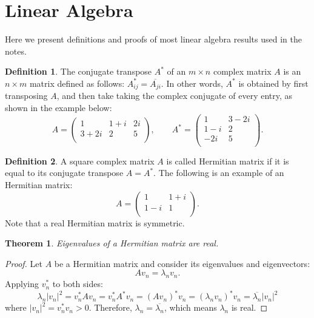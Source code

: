 \documentclass{article}
\newtheorem{theorem}{Theorem}[section]
\theoremstyle{definition}
\newtheorem{definition}{Definition}[section]
\begin{document}
\clearpage
\appendix
\section{Linear Algebra}
Here we present definitions and proofs of most linear algebra results used in the notes.
\begin{definition}
The conjugate transpose $A^*$ of an $m\times n$ complex matrix $A$ is an $n \times m$ matrix defined as follows: $A^*_{ij}=\overline{A_{ji}}$. In other words, $A^*$ is obtained by first transposing $A$, and then take taking the complex conjugate of every entry, as shown in the example below:
\begin{equation}
    A =
    \begin{pmatrix}
        1 & 1+i & 2i \\
        3+2i & 2 & 5 \\
    \end{pmatrix},
    \qquad
    A^* =
    \begin{pmatrix}
        1 & 3-2i \\
        1-i & 2 \\
        -2i & 5 \\
    \end{pmatrix}.
\end{equation}
\end{definition}

\begin{definition}
A square complex matrix $A$ is called Hermitian matrix if it is equal to its conjugate transpose $A=A^*$. The following is an example of an Hermitian matrix:
\begin{equation}
    A =
    \begin{pmatrix}
        1 & 1+i \\
        1-i & 1 \\
    \end{pmatrix}.
\end{equation}
Note that a real Hermitian matrix is symmetric.
\end{definition}

\begin{theorem}
Eigenvalues of a Hermitian matrix are real.
\end{theorem}
 
\begin{proof}
Let $A$ be a Hermitian matrix and consider its eigenvalues and eigenvectors:
\begin{equation}
    Av_n=\lambda_nv_n.
\end{equation}
Applying $v_n^*$ to both sides:
\begin{equation}
    \lambda_n |v_n|^2 = v_n^*Av_n = v_n^*A^*v_n = (Av_n)^*v_n = (\lambda_nv_n)^*v_n = \overline{\lambda_n}|v_n|^2
    \label{appendix-eq:eig}
\end{equation}
where $|v_n|^2=v_n^*v_n>0$. Therefore, $\lambda_n=\overline{\lambda_n}$, which means $\lambda_n$ is real.
\end{proof}
\end{document}
